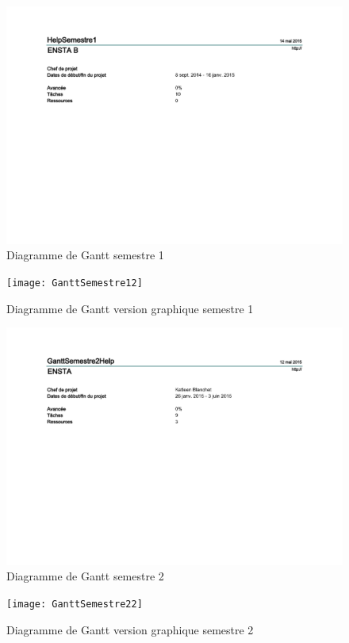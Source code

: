 \begin{figure}[H]
  \centering
  \includegraphics[scale=1]{GanttSemestre1}
  \caption{Diagramme de Gantt semestre 1}
  \label{fig:Gantt}
\end{figure}

\begin{figure}[H]
  \centering
  \texttt{[image: GanttSemestre12]}
  \caption{Diagramme de Gantt version graphique semestre 1}
  \label{fig:GanttGraphique}
\end{figure}

\begin{figure}[H]
  \centering
  \includegraphics[scale=1]{GanttSemestre2}
  \caption{Diagramme de Gantt semestre 2}
  \label{fig:GanttSemestre2}
\end{figure}

\begin{figure}[H]
  \centering
  \texttt{[image: GanttSemestre22]}
  \caption{Diagramme de Gantt version graphique semestre 2}
  \label{fig:GanttSemestre2}
\end{figure}